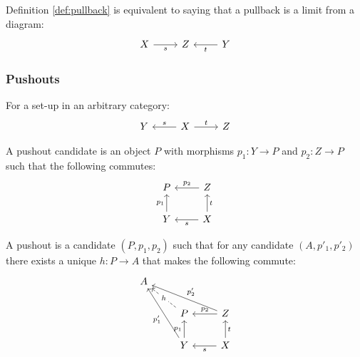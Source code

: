 \begin{definition}
  Definition \ref{def:pullback} is equivalent to saying that a pullback is a
  limit from a diagram:
  \[\begin{tikzcd}[ampersand replacement=\&]
    X \& Z \& Y
    \arrow["t", from=1-3, to=1-2]
    \arrow["s"', from=1-1, to=1-2]
  \end{tikzcd}\]
\end{definition}

\subsubsection*{Pushouts}

\begin{definition}
  For a set-up in an arbitrary category:
  \parencite{leinster:basic_category_theory}
  \[\begin{tikzcd}[ampersand replacement=\&]
    Y \& X \& Z
    \arrow["t", from=1-2, to=1-3]
    \arrow["s"', from=1-2, to=1-1]
  \end{tikzcd}\]

  A pushout candidate is an object $P$ with morphisms $p_1: Y \to P$ and $p_2:
  Z\to P$ such that the following commutes:
  \[\begin{tikzcd}[ampersand replacement=\&]
    P \& Z \\
    Y \& X
    \arrow["t"', from=2-2, to=1-2]
    \arrow["s", from=2-2, to=2-1]
    \arrow["{p_1}", from=2-1, to=1-1]
    \arrow["{p_2}"', from=1-2, to=1-1]
  \end{tikzcd}\]

  A pushout is a candidate $(P, p_1, p_2)$ such that for any candidate $(A,
  p'_1, p'_2)$ there exists a unique $h:P\to A$ that makes the following
  commute:
  \[\begin{tikzcd}[ampersand replacement=\&]
    A \\
    \& P \& Z \\
    \& Y \& X
    \arrow["t"', from=3-3, to=2-3]
    \arrow["s", from=3-3, to=3-2]
    \arrow["{p_1}", from=3-2, to=2-2]
    \arrow["{p_2}"', from=2-3, to=2-2]
    \arrow["h"{description}, dashed, from=2-2, to=1-1]
    \arrow["{p'_1}", from=3-2, to=1-1]
    \arrow["{p'_2}"', from=2-3, to=1-1]
  \end{tikzcd}\]
\end{definition}


